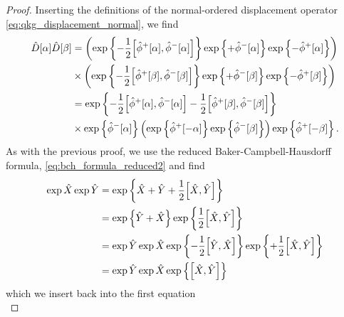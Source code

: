 \begin{proof}
	Inserting the definitions of the normal-ordered displacement operator \cref{eq:qkg_displacement_normal}, we find
	\begin{equation*}
		\begin{split}
			\hat{D}[\alpha]
			\hat{D}[\beta]
			&=
			\left(
				\exp\left\{
					-
					\frac{1}{2}
					\comm{\hat\phi^+[\alpha]}{\hat\phi^-[\alpha]}
				\right\}
				\exp\left\{
					+\hat\phi^-[\alpha]
				\right\}
				\exp\left\{
					-\hat\phi^+[\alpha]
				\right\}
			\right)
			\\
			&\times
			\left(
				\exp\left\{
					-
					\frac{1}{2}
					\comm{\hat\phi^+[\beta]}{\hat\phi^-[\beta]}
				\right\}
				\exp\left\{
					+\hat\phi^-[\beta]
				\right\}
				\exp\left\{
					-\hat\phi^+[\beta]
				\right\}
			\right)
			\\
			&=
			\exp\left\{
				-
				\frac{1}{2}
				\comm{\hat\phi^+[\alpha]}{\hat\phi^-[\alpha]}
				-
				\frac{1}{2}
				\comm{\hat\phi^+[\beta]}{\hat\phi^-[\beta]}
			\right\}
			\\
			&\times
			\exp\left\{
				\hat\phi^-[\alpha]
			\right\}
			\left(
				\exp\left\{
					\hat\phi^+[-\alpha]
				\right\}
				\exp\left\{
					\hat\phi^-[\beta]
				\right\}
			\right)
			\exp\left\{
				\hat\phi^+[-\beta]
			\right\}
			.
		\end{split}
	\end{equation*}
	As with the previous proof, we use the reduced Baker-Campbell-Hausdorff formula, \cref{eq:bch_formula_reduced2} and find
	\begin{equation*}
		\begin{split}
			\exp\hat{X}
			\exp\hat{Y}
			&=
			\exp\left\{
				\hat{X}
				+
				\hat{Y}
				+
				\frac{1}{2}
				\comm{\hat{X}}{\hat{Y}}
			\right\}
			\\
			&=
			\exp\left\{
				\hat{Y}
				+
				\hat{X}
			\right\}
			\exp\left\{
				\frac{1}{2}
				\comm{\hat{X}}{\hat{Y}}
			\right\}
			\\
			&=
			\exp\hat{Y}
			\exp\hat{X}
			\exp\left\{
				-
				\frac{1}{2}
				\comm{\hat{Y}}{\hat{X}}
			\right\}
			\exp\left\{
				+
				\frac{1}{2}
				\comm{\hat{X}}{\hat{Y}}
			\right\}
			\\
			&=
			\exp\hat{Y}
			\exp\hat{X}
			\exp\left\{
				\comm{\hat{X}}{\hat{Y}}
			\right\}
		\end{split}
	\end{equation*}
	which we insert back into the first equation
	\begin{equation*}

\end{equation*}
\end{proof}
